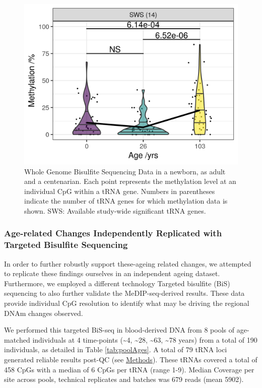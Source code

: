 \documentclass[
]{book}
\begin{document}
\begin{figure}

{\centering \includegraphics[width=0.6\linewidth]{./figs/heynViolinBBswsOnlyLabelled_BL} 

}

\caption{Whole Genome Bisulfite Sequencing Data in a newborn, as adult and a centenarian. Each point represents the methylation level at an individual CpG within a tRNA gene. Numbers in parentheses indicate the number of tRNA genes for which methylation data is shown. SWS: Available study-wide significant tRNA genes.}\label{fig:heyn}
\end{figure}



\hypertarget{age-related-changes-independently-replicated-with-targeted-bisulfite-sequencing}{%
\subsubsection{Age-related Changes Independently Replicated with Targeted Bisulfite Sequencing}\label{age-related-changes-independently-replicated-with-targeted-bisulfite-sequencing}}

In order to further robustly support these-ageing related changes, we attempted to replicate these findings ourselves in an independent ageing dataset.
Furthermore, we employed a different technology Targeted bisulfite (BiS) sequencing to also further validate the MeDIP-seq-derived results.
These data provide individual CpG resolution to identify what may be driving the regional DNAm changes observed.

We performed this targeted BiS-seq in blood-derived DNA from 8 pools of age-matched individuals at 4 time-points (\textasciitilde4, \textasciitilde28, \textasciitilde63, \textasciitilde78 years) from a total of 190 individuals, as detailed in Table \ref{tab:poolAges}.
A total of 79 tRNA loci generated reliable results post-QC (see \protect\hyperlink{targetedBiSseq}{Methods}).
These tRNAs covered a total of 458 CpGs with a median of 6 CpGs per tRNA (range 1-9).
Median Coverage per site across pools, technical replicates and batches was 679 reads (mean 5902).
\end{document}
